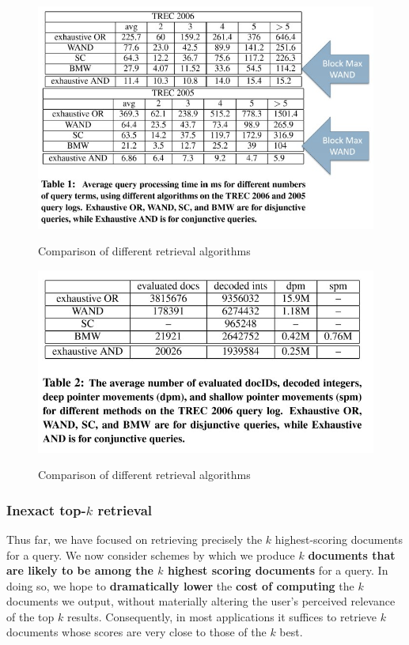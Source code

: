 \begin{figure}[h!]
		\centering
		\includegraphics[scale = 1.5]{img/block max results.jpg}
		\label{block max res}
        \caption{Comparison of different retrieval algorithms}
\end{figure}

\begin{figure}[h!]
		\centering
		\includegraphics[scale = 1.5]{img/block max results 2.jpg}
		\label{block max res 2}
        \caption{Comparison of different retrieval algorithms}
\end{figure}

\subsubsection{Inexact top-$k$ retrieval}
Thus far, we have focused on retrieving precisely the $k$ highest-scoring documents for a query. We now consider schemes by which we produce $k$ \textbf{documents that are likely to be among the $k$ highest scoring documents} for a query. In doing so, we hope to \textbf{dramatically lower} the \textbf{cost of computing} the $k$ documents we output, without materially altering the user’s perceived relevance of the top $k$ results. Consequently, in most applications it suffices to retrieve $k$ documents whose scores are very close to those of the $k$ best.


